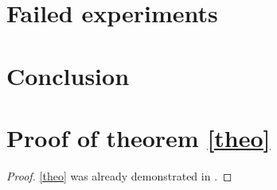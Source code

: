 \documentclass{thesisreport}
\begin{document}
 \chapter{Failed experiments}
 
 \chapter*{Conclusion}
 
 
 
 \appendix	
 
 \chapter{Proof of theorem \ref{theo}}
 \label{sec:prooftheorem}
 
 
 \begin{proof}
\eqref{theo} was already demonstrated in \cite{euclides300}.
\end{proof}
 
 
 
 
 
 
 
 
\end{document}
